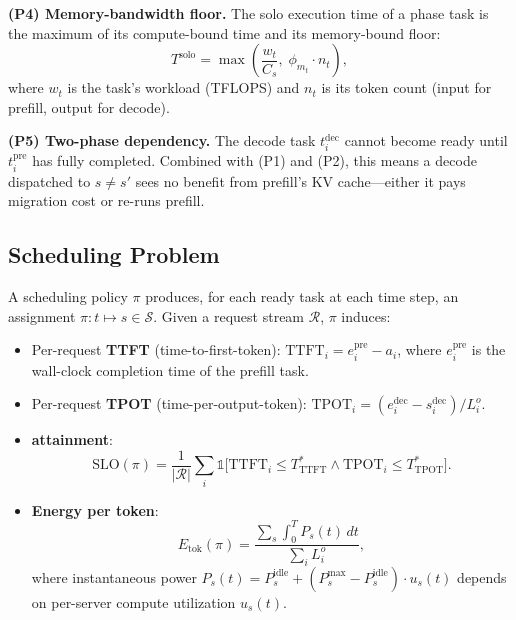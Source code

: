 \textbf{(P4) Memory-bandwidth floor.} The solo execution time
of a phase task is the maximum of its compute-bound time and
its memory-bound floor:
\begin{equation}
  T^{\text{solo}}
    = \max\!\left(\frac{w_t}{C_s},\;
                  \phi_{m_t} \cdot n_t\right),
\end{equation}
where $w_t$ is the task's workload (TFLOPS) and $n_t$ is its
token count (input for prefill, output for decode).

\textbf{(P5) Two-phase dependency.} The decode task
$t^{\text{dec}}_i$ cannot become ready until
$t^{\text{pre}}_i$ has fully completed. Combined with (P1) and
(P2), this means a decode dispatched to $s \neq s'$ sees no
benefit from prefill's KV cache---either it pays migration
cost or re-runs prefill.

\subsection{Scheduling Problem}
\label{sec:sched-problem}

A scheduling policy $\pi$ produces, for each ready task at each
time step, an assignment $\pi: t \mapsto s \in \mathcal{S}$.
Given a request stream $\mathcal{R}$, $\pi$ induces:

\begin{itemize}
\item Per-request \textbf{TTFT} (time-to-first-token):
  $\text{TTFT}_i = e^{\text{pre}}_i - a_i$, where
  $e^{\text{pre}}_i$ is the wall-clock completion time of the
  prefill task.

\item Per-request \textbf{TPOT} (time-per-output-token):
  $\text{TPOT}_i = (e^{\text{dec}}_i - s^{\text{dec}}_i) / L^o_i$.

\item \textbf{\slo{} attainment}:
  \begin{equation}
    \text{SLO}(\pi) = \frac{1}{|\mathcal{R}|} \sum_i
      \mathbb{1}\!\bigl[\text{TTFT}_i \le T^*_{\text{TTFT}}
        \land \text{TPOT}_i \le T^*_{\text{TPOT}}\bigr].
  \end{equation}

\item \textbf{Energy per token}:
  \begin{equation}
    E_{\text{tok}}(\pi) =
      \frac{\sum_s \int_0^T P_s(t)\,dt}{\sum_i L^o_i},
  \end{equation}
  where instantaneous power
  $P_s(t) = P^{\text{idle}}_s + (P^{\max}_s - P^{\text{idle}}_s)
  \cdot u_s(t)$ depends on per-server compute utilization
  $u_s(t)$.
\end{itemize}

